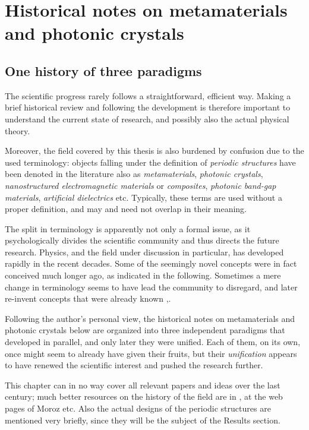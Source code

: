 \section{Historical notes on metamaterials and photonic crystals}%
\subsection{One history of three paradigms} %
The scientific progress rarely follows a straightforward, efficient way. Making a brief historical review and following the development is therefore important to understand the current state of research, and possibly also the actual physical theory. 

Moreover, the field covered by this thesis is also burdened by confusion due to the used terminology: objects falling under the definition of \textit{periodic structures} have been denoted in the literature also as \textit{metamaterials}, \textit{photonic crystals}, \textit{nanostructured electromagnetic materials} or \textit{composites}, \textit{photonic band-gap materials}, \textit{artificial dielectrics} etc. Typically, these terms are used without a proper definition, and may and need not \cite{smith2006homogenization} overlap in their meaning. 

The split in terminology is apparently not only a formal issue, as it psychologically divides the scientific community and thus directs the future research.
Physics, and the field under discussion in particular, has developed rapidly in the recent decades. Some of the seemingly novel concepts were in fact conceived much longer ago, as indicated in the following. Sometimes a mere change in terminology seems to have lead the community to disregard, and later re-invent concepts that were already known \cite{sihvola2002electromagnetic},\cite[p. 5]{klingshirn2007semiconductor}. 


Following the author's personal view,
the historical notes on metamaterials and photonic crystals below are organized into three independent paradigms that developed in parallel, and only later they were unified. Each of them, on its own, once might seem to already have given their fruits, but their \textit{unification} appears to have renewed the scientific interest and pushed the research further. 

This chapter can in no way cover all relevant papers and ideas over the last century; much better resources on the history of the field are in \cite{shamonina2007metamaterials,eleftheriades2012transforming, paudyal2013left}, at the web pages of Moroz \cite{moroz} etc. Also the actual designs of the periodic structures are mentioned very briefly, since they will be the subject of the Results section.

